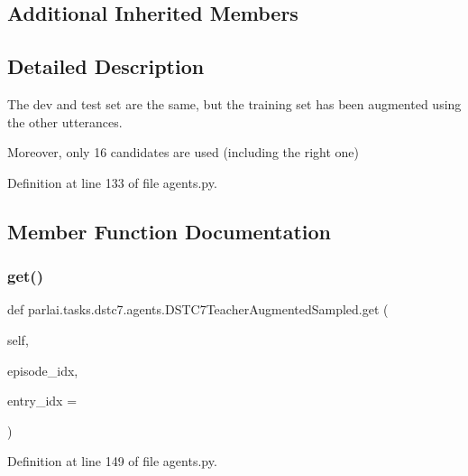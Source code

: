 \subsection*{Additional Inherited Members}


\subsection{Detailed Description}
\begin{DoxyVerb}The dev and test set are the same, but the training set has been augmented using the
other utterances.

Moreover, only 16 candidates are used (including the right one)
\end{DoxyVerb}
 

Definition at line 133 of file agents.\+py.



\subsection{Member Function Documentation}
\mbox{\label{classparlai_1_1tasks_1_1dstc7_1_1agents_1_1DSTC7TeacherAugmentedSampled_a0df2da11ff943988cb4eb01dab6354c8}} 
\subsubsection{\texorpdfstring{get()}{get()}}
{\footnotesize\ttfamily def parlai.\+tasks.\+dstc7.\+agents.\+D\+S\+T\+C7\+Teacher\+Augmented\+Sampled.\+get (\begin{DoxyParamCaption}\item[{}]{self,  }\item[{}]{episode\+\_\+idx,  }\item[{}]{entry\+\_\+idx = {} }\end{DoxyParamCaption})}



Definition at line 149 of file agents.\+py.



